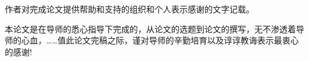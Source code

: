 \begin{thanks}
作者对完成论文提供帮助和支持的组织和个人表示感谢的文字记载。
\par
本论文是在导师的悉心指导下完成的，从论文的选题到论文的撰写，无不渗透着导师的心血，……值此论文完稿之际，谨对导师的辛勤培育以及谆谆教诲表示最衷心的感谢!
\end{thanks}
